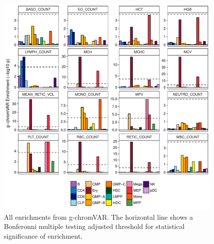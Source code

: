 \documentclass{article}\usepackage[]{graphicx}\usepackage[]{color}
\makeatletter
\def\maxwidth{ %
  \ifdim\Gin@nat@width>\linewidth
    \linewidth
  \else
    \Gin@nat@width
  \fi
}
\newenvironment{knitrout}{}{} %
\makeatother
\begin{document}
\begin{enumerate}[label=(\Alph*)]
\begin{knitrout}
\begin{figure}[H]
{\centering \includegraphics[width=\maxwidth]{figure/allGchromvar-1} 

}

\caption[All enrichments from g-chromVAR]{All enrichments from g-chromVAR. The horizontal line shows a Bonferonni multiple testing adjusted threshold for statistical significance of enrichment.}\label{fig:allGchromvar}
\end{figure}


\end{knitrout}


\begin{knitrout}
\color{fgcolor}\begin{figure}[H]


\end{figure}
\end{knitrout}
\end{enumerate}
\end{document}
